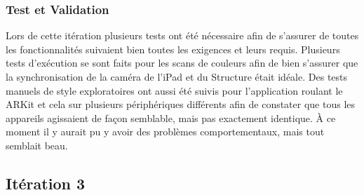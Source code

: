 \documentclass[rapport.tex]{subfiles}
\begin{document}
\subsubsection*{Test et Validation}
Lors de cette itération plusieurs tests ont été nécessaire afin de s'assurer de toutes les fonctionnalités suivaient bien toutes les exigences et leurs requis. Plusieurs tests d'exécution se sont faits pour les scans de couleurs afin de bien s’assurer que la synchronisation de la caméra de l’iPad et du Structure était idéale. Des tests manuels de style exploratoires ont aussi été suivis pour l’application roulant le ARKit et cela sur plusieurs périphériques différents afin de constater que tous les appareils agissaient de façon semblable, mais pas exactement identique. À ce moment il y aurait pu y avoir des problèmes comportementaux, mais tout semblait beau.
\subsection*{Itération 3}
\end{document}
